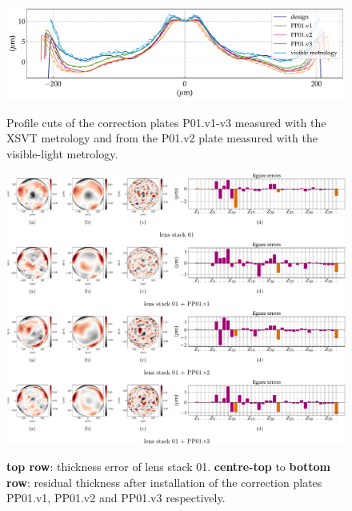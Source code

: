 \begin{refsection}
\begin{figure}[t]
        \centering
        {\includegraphics[width=0.7\linewidth]{figures/ch06/metrology_comp.pdf}}
        \caption[Profile cuts of the correction plates]{Profile cuts of the correction plates P01.v1-v3 measured with the XSVT metrology and from the P01.v2 plate measured with the visible-light metrology. }\label{fig:metrology_comp}
\end{figure}

\begin{figure}[t]
        \centering
        {\includegraphics[width=1.0\linewidth]{figures/ch06/alignment_xsvt.pdf}}
        \caption[Residual thickness after installation of the correction plates PP01.v1-v3]{\textbf{top row}: thickness error of lens stack 01. \textbf{centre-top} to \textbf{bottom row}: residual thickness after installation of the correction plates PP01.v1, PP01.v2 and PP01.v3 respectively.}\label{fig:alignment_xsvt}
\end{figure}

\clearpage


\end{refsection}
